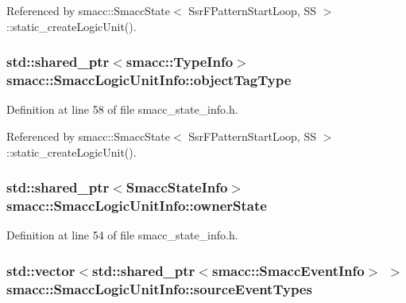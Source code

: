 Referenced by smacc\+::\+Smacc\+State$<$ Ssr\+F\+Pattern\+Start\+Loop, S\+S $>$\+::static\+\_\+create\+Logic\+Unit().

\subsubsection[{\texorpdfstring{object\+Tag\+Type}{objectTagType}}]{\setlength{\rightskip}{0pt plus 5cm}std\+::shared\+\_\+ptr$<${\bf smacc\+::\+Type\+Info}$>$ smacc\+::\+Smacc\+Logic\+Unit\+Info\+::object\+Tag\+Type}\hypertarget{structsmacc_1_1SmaccLogicUnitInfo_a3950a3dd81640dfe1e8eaebd2870dabb}{}\label{structsmacc_1_1SmaccLogicUnitInfo_a3950a3dd81640dfe1e8eaebd2870dabb}


Definition at line 58 of file smacc\+\_\+state\+\_\+info.\+h.



Referenced by smacc\+::\+Smacc\+State$<$ Ssr\+F\+Pattern\+Start\+Loop, S\+S $>$\+::static\+\_\+create\+Logic\+Unit().

\subsubsection[{\texorpdfstring{owner\+State}{ownerState}}]{\setlength{\rightskip}{0pt plus 5cm}std\+::shared\+\_\+ptr$<${\bf Smacc\+State\+Info}$>$ smacc\+::\+Smacc\+Logic\+Unit\+Info\+::owner\+State}\hypertarget{structsmacc_1_1SmaccLogicUnitInfo_a5584c7f4dac1938c089e8f9a2631ff6e}{}\label{structsmacc_1_1SmaccLogicUnitInfo_a5584c7f4dac1938c089e8f9a2631ff6e}


Definition at line 54 of file smacc\+\_\+state\+\_\+info.\+h.

\subsubsection[{\texorpdfstring{source\+Event\+Types}{sourceEventTypes}}]{\setlength{\rightskip}{0pt plus 5cm}std\+::vector$<$std\+::shared\+\_\+ptr$<${\bf smacc\+::\+Smacc\+Event\+Info}$>$ $>$ smacc\+::\+Smacc\+Logic\+Unit\+Info\+::source\+Event\+Types}\hypertarget{structsmacc_1_1SmaccLogicUnitInfo_ab753c234942c41eb973873f9222b9fd9}{}\label{structsmacc_1_1SmaccLogicUnitInfo_ab753c234942c41eb973873f9222b9fd9}


